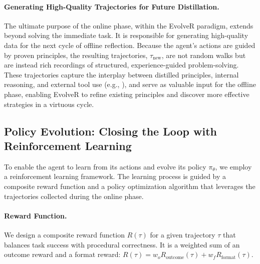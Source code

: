 \paragraph{Generating High-Quality Trajectories for Future Distillation.}
The ultimate purpose of the online phase, within the EvolveR paradigm, extends beyond solving the immediate task. It is responsible for generating high-quality data for the next cycle of offline reflection. Because the agent's actions are guided by proven principles, the resulting trajectories, $\tau_{\text{new}}$, are not random walks but are instead rich recordings of structured, experience-guided problem-solving. 
These trajectories capture the interplay between distilled principles, internal reasoning, and external tool use (e.g., ), and serve as valuable input for the offline phase, enabling EvolveR to refine existing principles and discover more effective strategies in a virtuous cycle.





\subsection{Policy Evolution: Closing the Loop with Reinforcement Learning}
\label{subsec:policy_evolution}

To enable the agent to learn from its actions and evolve its policy $\pi_\theta$, we employ a reinforcement learning framework. The learning process is guided by a composite reward function and a policy optimization algorithm that leverages the trajectories collected during the online phase.



\paragraph{Reward Function.}
We design a composite reward function $R(\tau)$ for a given trajectory $\tau$ that balances task success with procedural correctness. It is a weighted sum of an outcome reward and a format reward: $R(\tau) = w_o R_{\text{outcome}}(\tau) + w_f R_{\text{format}}(\tau)$.

